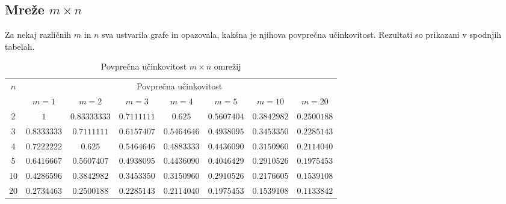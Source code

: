 \documentclass[a4paper, 16pt]{article}
\begin{document}
    \subsection{Mreže $m \times n$}
    Za nekaj različnih $m$ in $n$ sva ustvarila grafe in opazovala, kakšna je njihova 
    povprečna učinkovitost. 
    Rezultati so prikazani v spodnjih tabelah.

    \begin{table}[!h]
        \begin{tabular}{c|c|c|c|c|c|c|c}
            \multirow{2}{*}{$n$} & 
            \multicolumn{7}{c}{Povprečna učinkovitost}\\
               & $m=1$       & $m=2$           & $m=3$           & $m=4$         & $m = 5$     & $m = 10$    & $m=20$     \\ \hline
            2  & $1$         & $0.83333333$ & $0.7111111$ & $0.625$       & $0.5607404$ & $0.3842982$ & $0.2500188$\\
            3  & $0.8333333$ & $0.7111111$  & $0.6157407$ & $0.5464646$   & $0.4938095$ & $0.3453350$ & $0.2285143$\\
            4  & $0.7222222$ & $0.625$      & $0.5464646$ & $0.4883333$   & $0.4436090$ & $0.3150960$ & $0.2114040$\\
            5  & $0.6416667$ & $0.5607407$  & $0.4938095$ & $0.4436090$   & $0.4046429$ & $0.2910526$ & $0.1975453$\\
            10 & $0.4286596$ & $0.3842982$  & $0.3453350$ & $0.3150960$   & $0.2910526$ & $0.2176605$ & $0.1539108$\\
            20 & $0.2734463$ & $0.2500188$  & $0.2285143$ & $0.2114040$   & $0.1975453$ & $0.1539108$ & $0.1133842$\\

        \end{tabular}
        \caption{Povprečna učinkovitost $m \times n$ omrežij}
        \label{table: 1}
    \end{table}
\end{document}
